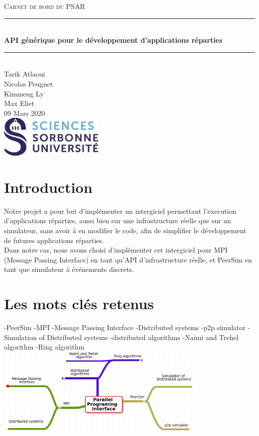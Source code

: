 \documentclass{article}
\date{\today}
\author{Tarik Atlaoui \\ Nicolas Peugnet \\ Kimmeng Ly \\ Max Eliet}
\begin{document}
\begin{titlepage}
	\enlargethispage{2cm}
	\newcommand{\HRule}{\rule{\linewidth}{0.5mm}}
	\center
	\textsc{\LARGE
	Carnet de bord du PSAR 
	} \\[1cm]
	\HRule \\[0.4cm]
	{ \huge \bfseries API générique pour le développement d'applications réparties \\[0.15cm] }
	\HRule \\[4cm]
	\large{Tarik Atlaoui \\[3mm] Nicolas Peugnet \\[3mm] Kimmeng Ly \\[3mm] Max Eliet} \\[3cm]
	09 Mars 2020 \\[3cm]
	\hfill \includegraphics[width=5cm]{logoSU.jpg}
\end{titlepage}

	\newpage
		\section{Introduction}
			\large{
			\indent Notre projet a pour but d'implémenter un intergiciel permettant l'execution d'applications réparties, aussi bien sur une infrastructure réelle que sur un simulateur, sans avoir à en modifier le code, afin de simplifier le développement de futures applications réparties.
\\[2mm]
			 \indent Dans notre cas, nous avons choisi d'implémenter cet intergiciel pour MPI (Message Passing Interface) en tant qu'API d'infrastructure réelle, et PeerSim en tant que simulateur à événements discrets.}
		
		\section{Les mots clés retenus}
		-PeerSim
		\newline
		-MPI
		\newline
		-Message Passing Interface
		\newline
		-Distributed systems
		\newline
		-p2p simulator
		\newline
		-Simulation of Distributed systems
		\newline
		-distributed algorithms
		\newline
		-Naimi and Trehel algorithm
		\newline
		-Ring algorithm
		\newline 
		\includegraphics[width=10cm]{mindmap.png}
		\newpage		
\end{document}
